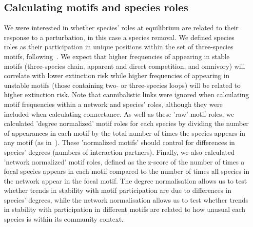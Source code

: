 \documentclass[12pt]{article}
\begin{document}
	\subsection*{Calculating motifs and species roles}

		We were interested in whether species' roles at equilibrium are related to their response to a perturbation, in this case a species removal. We defined species roles as their participation in unique positions within the set of three-species motifs, following~\citet{Stouffer2012,Cirtwill2015}. We expect that higher frequencies of appearing in stable motifs (three-species chain, apparent and direct competition, and omnivory) will correlate with lower extinction risk while higher frequencies of appearing in unstable motifs (those containing two- or three-species loops) will be related to higher extinction risk.	Note that cannibalistic links were ignored when calculating motif frequencies within a network and species' roles, although they were included when calculating connectance. As well as these 'raw' motif roles, we calculated 'degree normalized' motif roles for each species by dividing the number of appearances in each motif by the total number of times the species appears in any motif (as in~\citet{Cirtwill2015}). These 'normalized motifs' should control for differences in species' degrees (numbers of interaction partners). Finally, we also calculated 'network normalized' motif roles, defined as the z-score of the number of times a focal species appears in each motif compared to the number of times all species in the network appear in the focal motif.
		The degree normalisation allows us to test whether trends in stability with motif participation are due to differences in species' degrees, while the network normalisation allows us to test whether trends in stability with participation in different motifs are related to how unusual each species is within its community context.


\end{document}
